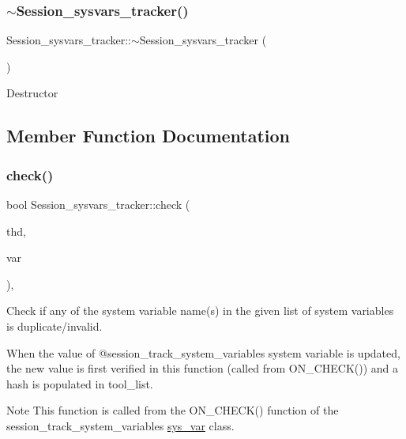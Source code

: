 \subsubsection{\texorpdfstring{$\sim$\+Session\+\_\+sysvars\+\_\+tracker()}{~Session\_sysvars\_tracker()}}
{\footnotesize\ttfamily Session\+\_\+sysvars\+\_\+tracker\+::$\sim$\+Session\+\_\+sysvars\+\_\+tracker (\begin{DoxyParamCaption}{ }\end{DoxyParamCaption})\hspace{0.3cm}{\ttfamily [inline]}}

Destructor 

\subsection{Member Function Documentation}
\mbox{\label{classSession__sysvars__tracker_a8e2849a2c33fbbfcd81243d8d44fea6f}} 
\subsubsection{\texorpdfstring{check()}{check()}}
{\footnotesize\ttfamily bool Session\+\_\+sysvars\+\_\+tracker\+::check (\begin{DoxyParamCaption}\item[{T\+HD $\ast$}]{thd,  }\item[{\mbox{\hyperlink{classset__var}{set\+\_\+var}} $\ast$}]{var }\end{DoxyParamCaption})\hspace{0.3cm}{\ttfamily [inline]}, {\ttfamily [virtual]}}



Check if any of the system variable name(s) in the given list of system variables is duplicate/invalid. 

When the value of @session\+\_\+track\+\_\+system\+\_\+variables system variable is updated, the new value is first verified in this function (called from O\+N\+\_\+\+C\+H\+E\+C\+K()) and a hash is populated in tool\+\_\+list.

\begin{DoxyNote}{Note}
This function is called from the O\+N\+\_\+\+C\+H\+E\+C\+K() function of the session\+\_\+track\+\_\+system\+\_\+variables\textquotesingle{} \mbox{\hyperlink{classsys__var}{sys\+\_\+var}} class.
\end{DoxyNote}

